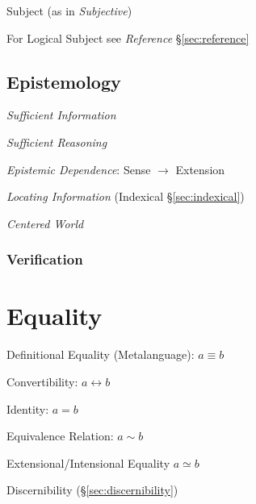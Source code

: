 Subject (as in \emph{Subjective})

For Logical Subject see \emph{Reference} \S\ref{sec:reference}



\subsection{Epistemology}\label{sec:epistemology}
\cite{chalmers02}

\emph{Sufficient Information}

\emph{Sufficient Reasoning}

\emph{Epistemic Dependence}: Sense $\rightarrow$ Extension

\emph{Locating Information} (Indexical \S\ref{sec:indexical})

\emph{Centered World}



\subsubsection{Verification}\label{sec:verification}



\section{Equality}\label{sec:equality}\cite{baez15}

Definitional Equality (Metalanguage): $a \equiv b$

Convertibility: $a \leftrightarrow b$

Identity: $a = b$

Equivalence Relation: $a \sim b$

Extensional/Intensional Equality $a \simeq b$

Discernibility (\S\ref{sec:discernibility})

